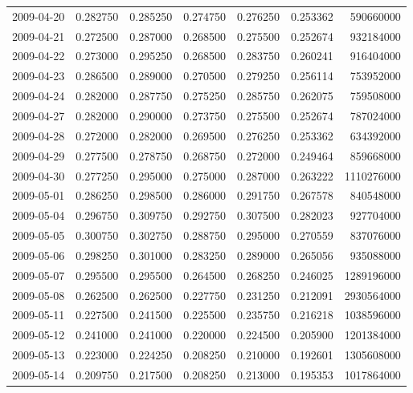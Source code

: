 \begin{tabular}{lrrrrrr}
2009-04-20 &    0.282750 &    0.285250 &    0.274750 &    0.276250 &    0.253362 &   590660000 \\
2009-04-21 &    0.272500 &    0.287000 &    0.268500 &    0.275500 &    0.252674 &   932184000 \\
2009-04-22 &    0.273000 &    0.295250 &    0.268500 &    0.283750 &    0.260241 &   916404000 \\
2009-04-23 &    0.286500 &    0.289000 &    0.270500 &    0.279250 &    0.256114 &   753952000 \\
2009-04-24 &    0.282000 &    0.287750 &    0.275250 &    0.285750 &    0.262075 &   759508000 \\
2009-04-27 &    0.282000 &    0.290000 &    0.273750 &    0.275500 &    0.252674 &   787024000 \\
2009-04-28 &    0.272000 &    0.282000 &    0.269500 &    0.276250 &    0.253362 &   634392000 \\
2009-04-29 &    0.277500 &    0.278750 &    0.268750 &    0.272000 &    0.249464 &   859668000 \\
2009-04-30 &    0.277250 &    0.295000 &    0.275000 &    0.287000 &    0.263222 &  1110276000 \\
2009-05-01 &    0.286250 &    0.298500 &    0.286000 &    0.291750 &    0.267578 &   840548000 \\
2009-05-04 &    0.296750 &    0.309750 &    0.292750 &    0.307500 &    0.282023 &   927704000 \\
2009-05-05 &    0.300750 &    0.302750 &    0.288750 &    0.295000 &    0.270559 &   837076000 \\
2009-05-06 &    0.298250 &    0.301000 &    0.283250 &    0.289000 &    0.265056 &   935088000 \\
2009-05-07 &    0.295500 &    0.295500 &    0.264500 &    0.268250 &    0.246025 &  1289196000 \\
2009-05-08 &    0.262500 &    0.262500 &    0.227750 &    0.231250 &    0.212091 &  2930564000 \\
2009-05-11 &    0.227500 &    0.241500 &    0.225500 &    0.235750 &    0.216218 &  1038596000 \\
2009-05-12 &    0.241000 &    0.241000 &    0.220000 &    0.224500 &    0.205900 &  1201384000 \\
2009-05-13 &    0.223000 &    0.224250 &    0.208250 &    0.210000 &    0.192601 &  1305608000 \\
2009-05-14 &    0.209750 &    0.217500 &    0.208250 &    0.213000 &    0.195353 &  1017864000 \\

\end{tabular}
